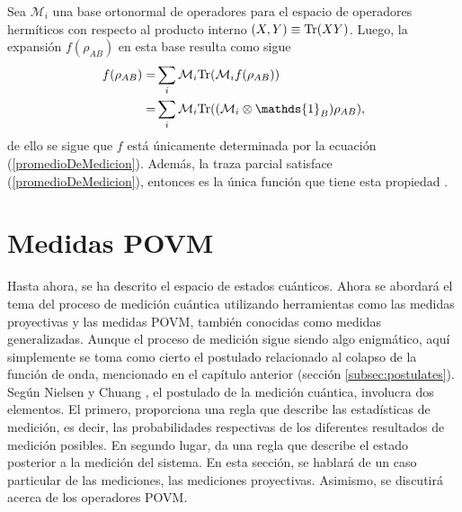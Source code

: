 Sea $\mathcal{M}_i$ una base ortonormal de operadores para el espacio de
operadores hermíticos con respecto al producto interno $(X,Y) \equiv {\rm Tr}(XY)$. Luego, la expansión $f (\rho_{AB} )$ en esta base resulta como sigue
\[\begin{split}
	f(\rho_{AB})=&\sum_{i}\mathcal{M}_i\tr(\mathcal{M}_i f(\rho_{AB}))\\
	=&\sum_{i}\mathcal{M}_i \tr((\mathcal{M}_i\otimes \mathds{1}_B)\rho_{AB}),\\
\end{split}\] 
de ello se sigue que $f$ está únicamente determinada por la ecuación
({\ref{promedioDeMedicion}}). Además, la traza parcial satisface
({\ref{promedioDeMedicion}}), entonces es la única función que tiene esta
propiedad {\cite{nielsen_chuang_2010}}.






\section{Medidas POVM}\label{sec:MedidaPOVM} %
Hasta ahora, se ha descrito el espacio de estados cuánticos. Ahora se abordará
el tema del proceso de medición cuántica utilizando herramientas como las
medidas proyectivas y las medidas POVM, también conocidas como medidas
generalizadas. Aunque el proceso de medición  sigue siendo algo enigmático,
aquí simplemente se toma como cierto el postulado relacionado al colapso de la
función de onda, mencionado en el capítulo anterior (sección
{\ref{subsec:postulates}}). Según Nielsen y Chuang
{\cite{nielsen_chuang_2010}}, el postulado de la medición cuántica, involucra
dos elementos. El primero, proporciona una regla que describe las estadísticas
de medición, es decir, las probabilidades respectivas de los diferentes
resultados de medición posibles. En segundo lugar, da una regla que describe el
estado posterior a la medición del sistema. En esta sección, se hablará de un
caso particular de las mediciones, las mediciones proyectivas. Asimismo, se
discutirá acerca de los operadores POVM\@.



